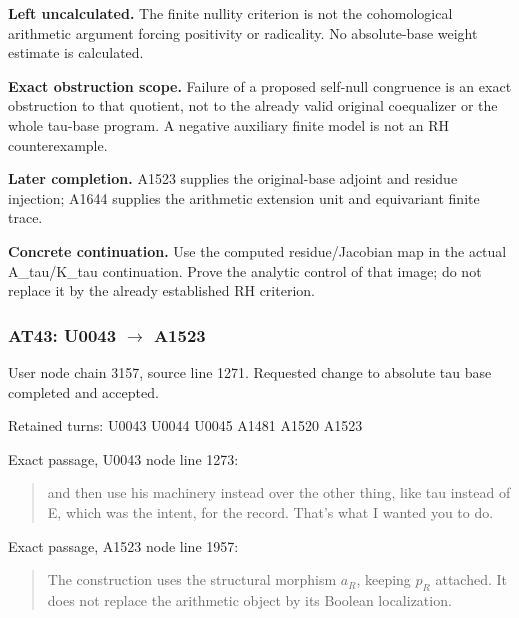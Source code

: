 \textbf{Left uncalculated.} The finite nullity criterion is not the
cohomological arithmetic argument forcing positivity or radicality. No
absolute-base weight estimate is calculated.

\textbf{Exact obstruction scope.} Failure of a proposed self-null
congruence is an exact obstruction to that quotient, not to the already
valid original coequalizer or the whole tau-base program. A negative
auxiliary finite model is not an RH counterexample.

\textbf{Later completion.} A1523 supplies the original-base adjoint and
residue injection; A1644 supplies the arithmetic extension unit and
equivariant finite trace.

\textbf{Concrete continuation.} Use the computed residue/Jacobian map in
the actual A\_tau/K\_tau continuation. Prove the analytic control of
that image; do not replace it by the already established RH criterion.

\subsubsection{\texorpdfstring{AT43: U0043
\allowbreak{}\ensuremath{→}\allowbreak{}
A1523}{AT43: U0043  A1523}}\label{at43-u0043-a1523}

User node \protect{} chain
3157, source line 1271. Requested change to absolute tau base completed
and accepted.

Retained turns: U0043
\protect{} U0044
\protect{} U0045
\protect{} A1481
\protect{} A1520
\protect{} A1523
\protect{}

Exact passage, U0043 node
\protect{} line 1273:

\begin{quote}
and then use his machinery instead over the other thing, like tau
instead of E, which was the intent, for the record. That's what I wanted
you to do.
\end{quote}

Exact passage, A1523 node
\protect{} line 1957:

\begin{quote}
The construction uses the structural morphism \(a_R\), keeping \(p_R\)
attached. It does not replace the arithmetic object by its Boolean
localization.
\end{quote}


